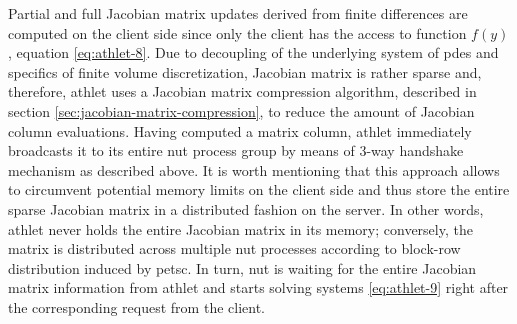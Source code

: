 Partial and full Jacobian matrix updates derived from finite differences are computed on the client side since only the client has the access to function $f(y)$, equation \ref{eq:athlet-8}. Due to decoupling of the underlying system of \acrshort{pde}s and specifics of finite volume discretization, Jacobian matrix is rather sparse and, therefore, \acrshort{athlet} uses a Jacobian matrix compression algorithm, described in section \ref{sec:jacobian-matrix-compression}, to reduce the amount of Jacobian column evaluations. Having computed a matrix column, \acrshort{athlet} immediately broadcasts it to its entire \acrshort{nut} process group by means of 3-way handshake mechanism as described above. It is worth mentioning that this approach allows to circumvent potential memory limits on the client side and thus store the entire sparse Jacobian matrix in a distributed fashion on the server. In other words, \acrshort{athlet} never holds the entire Jacobian matrix in its memory; conversely, the matrix is distributed across multiple \acrshort{nut} processes according to block-row distribution induced by \acrshort{petsc}. In turn, \acrshort{nut} is waiting for the entire Jacobian matrix information from \acrshort{athlet} and starts solving systems \ref{eq:athlet-9} right after the corresponding request from the client.\\


